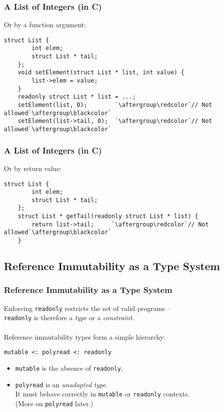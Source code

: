 \documentclass{beamer}
\newcommand{\code}[1]{\lstinline$#1$}
\begin{document}
\begin{frame}[containsverbatim]
\frametitle{A List of Integers (in C)}
Or by a function argument:
\begin{lstlisting}[escapechar=`]
	struct List {
		int elem;
		struct List * tail;
	};
	void setElement(struct List * list, int value) {
		list->elem = value;
	}
	readonly struct List * list = ...;
	setElement(list, 0);        `\aftergroup\redcolor`// Not allowed`\aftergroup\blackcolor`
	setElement(list->tail, 0);  `\aftergroup\redcolor`// Not allowed`\aftergroup\blackcolor`
\end{lstlisting}
\end{frame}

\begin{frame}[containsverbatim]
\frametitle{A List of Integers (in C)}
Or by return value:
\begin{lstlisting}[escapechar=`]
	struct List {
		int elem;
		struct List * tail;
	};
	struct List * getTail(readonly struct List * list) {
		return list->tail;     `\aftergroup\redcolor`// Not allowed`\aftergroup\blackcolor`
	}
\end{lstlisting}
\end{frame}

	\subsection{Reference Immutability as a Type System}

\begin{frame}[containsverbatim]
\frametitle{Reference Immutability as a Type System}
	Enforcing \code{readonly} restricts the set of valid programs --\\
	\code{readonly} is therefore a \emph{type} or a \emph{constraint}.\\
\hfill\\
	Reference immutability types form a simple hierarchy:
\begin{center}
	\code{mutable <: polyread <: readonly}
\end{center}
\begin{itemize}
\item \code{mutable} is the absence of \code{readonly}.
\item \code{polyread} is an \emph{unadapted type}.\\
	It must behave correctly in \code{mutable} or \code{readonly} contexts.\\
	(More on \code{polyread} later.)   %
\end{itemize}
\end{frame}
\end{document}
